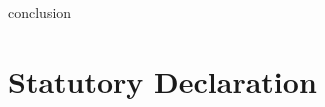 \documentclass[11pt, a4paper]{article} %
\makeatletter
\theoremstyle{definition}
\newcommand{\signature}[2][5cm]{%
  \begin{tabular}{@{}p{#1}@{}}
    #2 \\[2\normalbaselineskip] \hrule \\[0pt]
    {\small \textit{Signature}} \\[2\normalbaselineskip] \hrule \\[0pt]
    {\small \textit{Place, Date}}
  \end{tabular}
}
\makeatother
\begin{document}
{conclusion}

\newpage %

%
\medskip



\newpage %
\thispagestyle{empty} %
\section*{Statutory Declaration} %

\vspace*{1in} %




\end{document}
